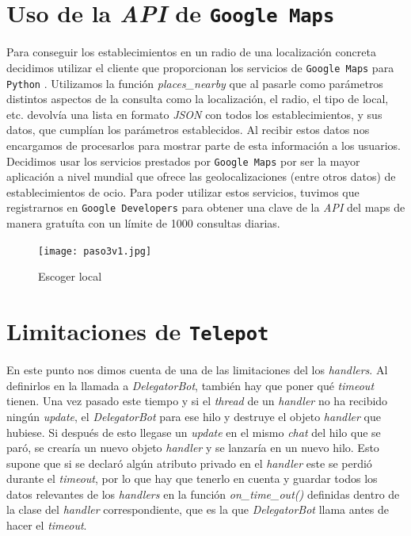 \documentclass[oneside]{memoir}
\begin{document}
\section{Uso de la \textit{API} de \texttt{Google Maps}}
Para conseguir los establecimientos en un radio de una localización concreta decidimos utilizar el cliente que proporcionan los servicios de \texttt{Google Maps} para \texttt{Python} \cite{Google}. Utilizamos la función \textit{places\_nearby} que al pasarle como parámetros distintos aspectos de la consulta como la localización, el radio, el tipo de local, etc. devolvía una lista en formato \textit{JSON} con todos los establecimientos, y sus datos, que cumplían los parámetros establecidos. Al recibir estos datos nos encargamos de procesarlos para mostrar parte de esta información a los usuarios. 
Decidimos usar los servicios prestados por \texttt{Google Maps} por ser la mayor aplicación a nivel mundial que ofrece las geolocalizaciones (entre otros datos) de establecimientos de ocio. Para poder utilizar estos servicios, tuvimos que registrarnos en \texttt{Google Developers} para obtener una clave de la \textit{API} del maps de manera gratuíta con un límite de 1000 consultas diarias.

\begin{figure}[h!]
  \centering
  \texttt{[image: paso3v1.jpg]}
  \caption{Escoger local}
  \label{fig:Paso3v1}
\end{figure}

\section{Limitaciones de \texttt{Telepot}}
En este punto nos dimos cuenta de una de las limitaciones del los \textit{handlers}. Al definirlos en la llamada a \textit{DelegatorBot}, también hay que poner qué \textit{timeout} tienen. Una vez pasado este tiempo y si el \textit{thread} de un \textit{handler} no ha recibido ningún \textit{update}, el \textit{DelegatorBot} para ese hilo y destruye el objeto \textit{handler} que hubiese. Si después de esto llegase un \textit{update} en el mismo \textit{chat} del hilo que se paró, se crearía un nuevo objeto \textit{handler} y se lanzaría en un nuevo hilo. Esto supone que si se declaró algún atributo privado en el \textit{handler} este se perdió durante el \textit{timeout}, por lo que hay que tenerlo en cuenta y guardar todos los datos relevantes de los \textit{handlers} en la función \textit{on\_time\_out()} definidas dentro de la clase del \textit{handler} correspondiente, que es la que \textit{DelegatorBot} llama antes de hacer el \textit{timeout}.
\end{document}
